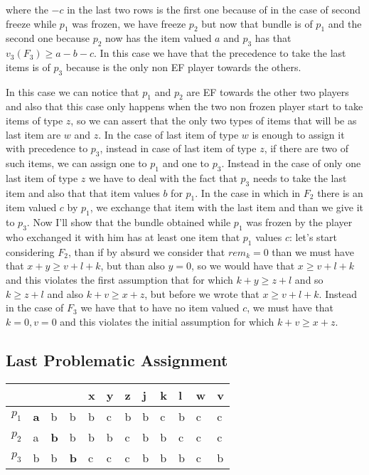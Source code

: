\documentclass{article}
\begin{document}
where the $-c$ in the last two rows is the first one because of in the case of second freeze while $p_1$ was frozen, we have freeze $p_2$ but now that bundle is of $p_1$ and the second one because $p_2$ now has the item valued $a$ and $p_3$ has that $v_3(F_3) \ge a - b - c$. In this case we have that the precedence to take the last items is of $p_3$ because is the only non EF player towards the others. 

In this case we can notice that $p_1$ and $p_2$ are EF towards the other two players and also that this case only happens when the two non frozen player start to take items of type $z$, so we can assert that the only two types of items that will be as last item are $w$ and $z$. In the case of last item of type $w$ is enough to assign it with precedence to $p_3$, instead in case of last item of type $z$, if there are two of such items, we can assign one to $p_1$ and one to $p_3$. Instead in the case of only one last item of type $z$ we have to deal with the fact that $p_3$ needs to take the last item and also that that item values $b$ for $p_1$. In the case in which in $F_2$ there is an item valued $c$ by $p_1$, we exchange that item with the last item and than we give it to $p_3$. Now I'll show that the bundle obtained while $p_1$ was frozen by the player who exchanged it with him has at least one item that $p_1$ values $c$: let's start considering $F_2$, than if by absurd we consider that $rem_k = 0$ than we must have that $x + y \ge v + l + k$, but than also $y = 0$, so we would have that $x \ge v + l + k$ and this violates the first assumption that for which $k + y \ge z + l$ and so $k \ge z + l$ and also $k + v \ge x + z$, but before we wrote that $x \ge v + l + k$. Instead in the case of $F_3$ we have that to have no item valued $c$, we must have that $k = 0, v = 0$ and this violates the initial assumption for which $k + v \ge x + z$.

\subsection{Last Problematic Assignment}
\begin{table}[h]
\centering
\begin{tabular}{|l|l|l|l|l|l|l|l|l|l|l|l|}
\hline
      &                 &               &               & x & y & z & j & k & l & w & v \\ \hline
$p_1$ & \textbf{a}     & b             & b             & b & c & b & b & c & b & c & c \\ \hline
$p_2$ & a               & \textbf{b}    & b             & b & b & c & b & b & c & c & c \\ \hline
$p_3$ & b               & b             & \textbf{b}    & c & c & c & b & b & b & c & b \\ \hline
\end{tabular}
\end{table}
\end{document}
